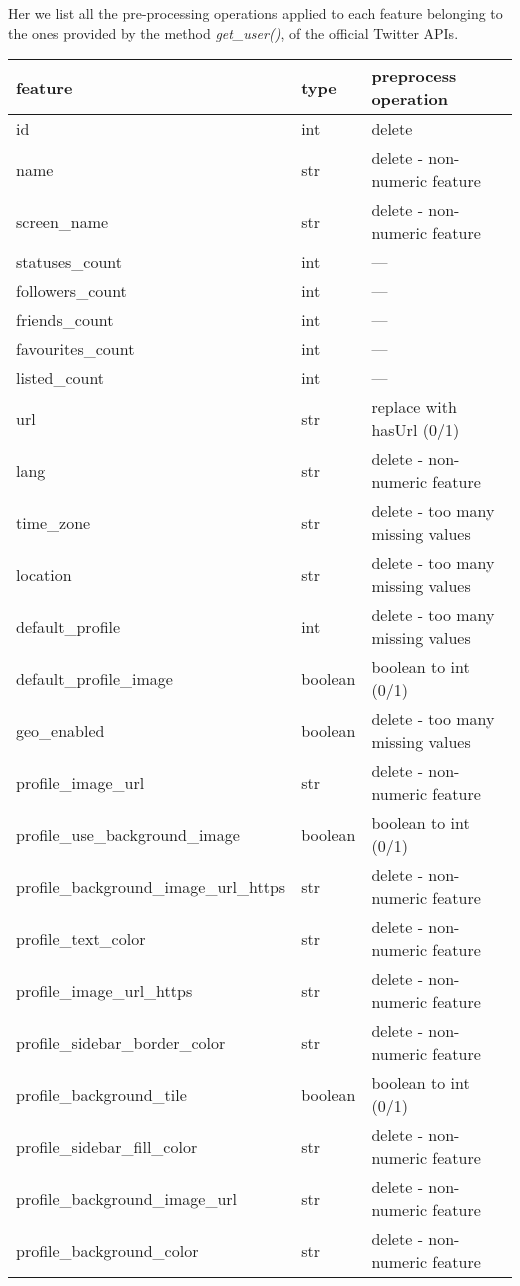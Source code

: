 Her we list all the pre-processing operations applied to each feature belonging to the ones provided by the method \textit{get\_user()}, of the official Twitter APIs.
\newpage
\small
\begin{center}
	\begin{tabular}{lll}
		\\feature&type&preprocess operation\\
		\hline\hline
		id&int&delete\\
		name&str&delete - non-numeric feature\\
		screen\_name&str&delete - non-numeric feature\\
		statuses\_count&int&---\\
		followers\_count&int&---\\
		friends\_count&int&---\\
		favourites\_count&int&---\\
		listed\_count&int&---\\
		url&str&replace with hasUrl (0/1)\\
		lang&str&delete - non-numeric feature\\
		time\_zone&str&delete - too many missing values\\
		location&str&delete - too many missing values\\
		default\_profile&int&delete - too many missing values\\
		default\_profile\_image&boolean&boolean to int (0/1)\\
		geo\_enabled&boolean&delete - too many missing values\\
		profile\_image\_url&str&delete - non-numeric feature\\
		profile\_use\_background\_image&boolean&boolean to int (0/1)\\
		profile\_background\_image\_url\_https&str&delete - non-numeric feature\\
		profile\_text\_color&str&delete - non-numeric feature\\
		profile\_image\_url\_https&str&delete - non-numeric feature\\
		profile\_sidebar\_border\_color&str&delete - non-numeric feature\\
		profile\_background\_tile&boolean&boolean to int (0/1)\\
		profile\_sidebar\_fill\_color&str&delete - non-numeric feature\\
		profile\_background\_image\_url&str&delete - non-numeric feature\\
		profile\_background\_color&str&delete - non-numeric feature\\

\end{tabular}
\end{center}

